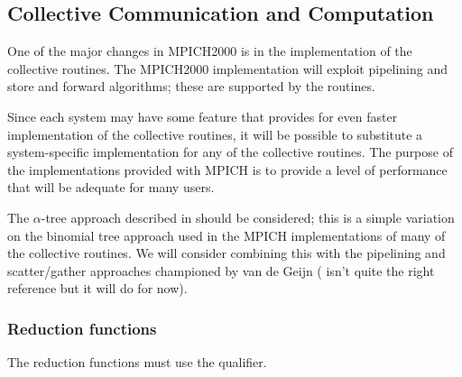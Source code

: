 \documentclass{article}
\begin{document}
\subsubsection{}
\subsubsection{}
\subsubsection{}
\subsubsection{}

\subsection{Collective Communication and Computation}
One of the major changes in MPICH2000 is in the implementation of the
collective routines.  The MPICH2000 implementation will exploit
pipelining and store and forward algorithms; these are supported by
the  routines.  

Since each system may have some feature that provides for even faster
implementation of the collective routines, it will be possible to
substitute a system-specific implementation for any of the collective
routines.  The purpose of the implementations provided with MPICH is
to provide a level of performance that will be adequate
for many users.  

The $\alpha$-tree approach described in
\cite{bern:mpi-collective:hpcn99} should be considered; this is a
simple variation on the binomial tree approach used in the MPICH
implementations of many of the collective routines.  We will consider
combining this with the pipelining and scatter/gather approaches
championed by van de Geijn (\cite{vandegeijn} isn't quite the right
reference but it will do for now).


\subsubsection{Reduction functions}
The reduction functions must use the  qualifier.
\end{document}
